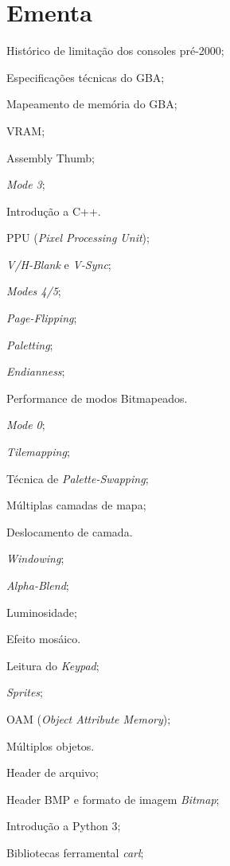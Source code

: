 \documentclass{article}
\begin{document}
\section{Ementa}
\begin{itemize*}[label={}]
    \item[] Histórico de limitação dos consoles pré-2000;
    \item[] Especificações técnicas do GBA;
    \item[] Mapeamento de memória do GBA;
    \item[] VRAM;
    \item[] Assembly Thumb;
    \item[] \textit{Mode 3};
    \item[] Introdução a C++.
    \item[] PPU (\textit{Pixel Processing Unit});
    \item[] \textit{V/H-Blank} e \textit{V-Sync};
    \item[] \textit{Modes 4/5};
    \item[] \textit{Page-Flipping};
    \item[] \textit{Paletting};
    \item[] \textit{Endianness};
    \item[] Performance de modos Bitmapeados.
    \item[] \textit{Mode 0};
    \item[] \textit{Tilemapping};
    \item[] Técnica de \textit{Palette-Swapping};
    \item[] Múltiplas camadas de mapa;
    \item[] Deslocamento de camada.
    \item[] \textit{Windowing};
    \item[] \textit{Alpha-Blend};
    \item[] Luminosidade;
    \item[] Efeito mosáico.
    \item[] Leitura do \textit{Keypad};
    \item[] \textit{Sprites};
    \item[] OAM (\textit{Object Attribute Memory});
    \item[] Múltiplos objetos.
    \item[] Header de arquivo;
    \item[] Header BMP e formato de imagem \textit{Bitmap};
    \item[] Introdução a Python 3;
    \item[] Bibliotecas ferramental \textit{carl};

\end{itemize*}
\end{document}
